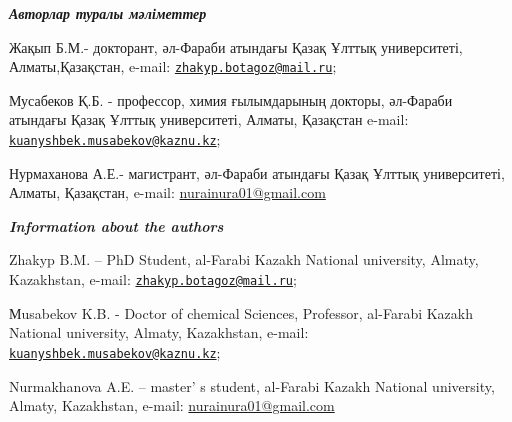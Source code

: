 \begin{authorinfo}
\hspace{1em}\emph{{\bfseries Авторлар туралы мәліметтер}}

Жақып Б.М.- докторант, әл-Фараби атындағы Қазақ Ұлттық университеті,
Алматы,Қазақстан, e-mail:
\href{mailto:zhakyp.botagoz@mail.ru}{\nolinkurl{zhakyp.botagoz@mail.ru}};

Мусабеков Қ.Б. - профессор, химия ғылымдарының докторы, әл-Фараби
атындағы Қазақ Ұлттық университеті, Алматы, Қазақстан e-mail:
\href{mailto:kuanyshbek.musabekov@kaznu.kz}{\nolinkurl{kuanyshbek.musabekov@kaznu.kz}};

Нурмаханова А.Е.- магистрант, әл-Фараби атындағы Қазақ Ұлттық
университеті, Алматы, Қазақстан, e-mail:
\href{mailto:zhakyp.botagoz@mail.ru}{nurainura01@gmail.com}

\hspace{1em}\emph{{\bfseries Information about the authors}}

Zhakyp B.M. -- PhD Student, al-Farabi Kazakh National university,
Almaty, Kazakhstan, e-mail:
\href{mailto:zhakyp.botagoz@mail.ru}{\nolinkurl{zhakyp.botagoz@mail.ru}};

Мusabekov K.B. - Doctor of chemical Sciences, Professor, al-Farabi
Kazakh National university, Almaty, Kazakhstan, e-mail:
\href{mailto:kuanyshbek.musabekov@kaznu.kz}{\nolinkurl{kuanyshbek.musabekov@kaznu.kz}};

Nurmakhanova A.E. -- master' s student, al-Farabi Kazakh
National university, Almaty, Kazakhstan, e-mail:
\href{mailto:zhakyp.botagoz@mail.ru}{nurainura01@gmail.com}
\end{authorinfo}
